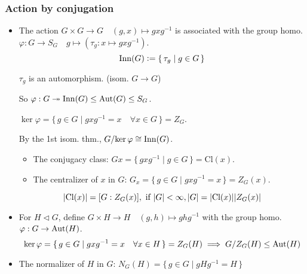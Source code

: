 \subsubsection{Action by conjugation}
\begin{itemize}
  \item The action $G \times G \to G \quad (g,x) \mapsto gxg^{-1}$ is
    associated with the group homo. $\varphi: G \to S_G \quad g \mapsto
    (\tau_g: x \mapsto gxg^{-1})$.
    \[
      \operatorname{Inn}(G) \vcentcolon= \{\, \tau_g \mid g \in G \,\}
    \]

    \begin{fact} 
      $\tau_g$ is an automorphism. (isom. $G \to G$)
    \end{fact}

    So $\varphi: G \twoheadrightarrow \operatorname{Inn}(G) \le \operatorname{Aut}(G) \le S_G$.

    $\ker\varphi = \{\, g\in G \mid gxg^{-1} = x \quad \forall x \in G \,\}
    = Z_G$.

    By the 1st isom. thm., ${G}/{\ker\varphi} \cong \operatorname{Inn}(G)$.
    \begin{itemize}
      \item The conjugacy class:
        $Gx = \{\, gxg^{-1} \mid g \in G \,\} = \text{Cl}(x)$.
      \item The centralizer of $x$ in $G$:
        $G_x = \{\, g \in G \mid gxg^{-1} = x \,\} = Z_G(x)$.
    \end{itemize}
    \[
      \lvert\text{Cl}(x)\rvert = [G:Z_G(x)], \text{~if~} \lvert G\rvert < \infty, 
      \lvert G\rvert = \lvert\text{Cl}(x)\rvert\lvert Z_G(x)\rvert
    \]
  \item For $H \lhd G$, define $G \times H \to H \quad (g, h) \mapsto ghg^{-1}$
    with the group homo. $\varphi: G \to \operatorname{Aut}(H)$.
    \[
      \ker\varphi = \{\, g\in G \mid gxg^{-1} = x \quad \forall x \in H \,\}
      = Z_G(H)
      \implies {G}/{Z_G(H)} \le \operatorname{Aut}(H)
    \]
  \item The normalizer of $H$ in $G$:
    $N_G(H) = \{\, g\in G \mid gHg^{-1} = H \,\}$
\end{itemize}
